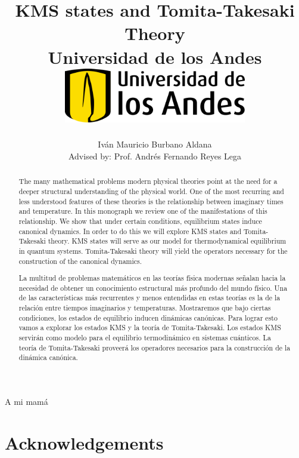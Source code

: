 \documentclass[12pt]{report}
\title 
{
	{KMS states and Tomita-Takesaki Theory}\\
	{\large Universidad de los Andes}\\
	\vspace{1.5cm}
	{\includegraphics[width = 0.6\textwidth]{logo.png}}	
}
\author{Iván Mauricio Burbano Aldana\\[1cm]{\small Advised by: Prof. Andrés Fernando Reyes Lega}}
\newenvironment{dedication}
  {\clearpage           %
   \thispagestyle{empty}%
   \vspace*{\stretch{1}}%
   \raggedleft          %
  }
  {\par %
   \vspace{\stretch{3}} %
   \clearpage           %
  }
\theoremstyle{definition}
\begin{document}

\maketitle

\begin{dedication}
{\LARGE\calligra A mi mamá}
\end{dedication}

\begin{abstract}

The many mathematical problems modern physical theories point at the need for a deeper structural understanding of the physical world. One of the most recurring and less understood features of these theories is the relationship between imaginary times and temperature. In this monograph we review one of the manifestations of this relationship. We show that under certain conditions, equilibrium states induce canonical dynamics. In order to do this we will explore KMS states and Tomita-Takesaki theory. KMS states will serve as our model for thermodynamical equilibrium in quantum systems. Tomita-Takesaki theory will yield the operators necessary for the construction of the canonical dynamics.

\end{abstract}

\begin{otherlanguage}{spanish}
\begin{abstract}

La multitud de problemas matemáticos en las teorías física modernas señalan hacia la necesidad de obtener un conocimiento estructural más profundo del mundo físico. Una de las características más recurrentes y menos entendidas en estas teorías es la de la relación entre tiempos imaginarios y temperaturas. Mostraremos que bajo ciertas condiciones, los estados de equilibrio inducen dinámicas canónicas. Para lograr esto vamos a explorar los estados KMS y la teoría de Tomita-Takesaki. Los estados KMS servirán como modelo para el equilibrio termodinámico en sistemas cuánticos. La teoría de Tomita-Takesaki proveerá los operadores necesarios para la construcción de la dinámica canónica.

\end{abstract}
\end{otherlanguage}

\newpage

\chapter*{Acknowledgements}
\end{document}

